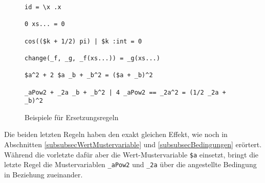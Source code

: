 \begin{figure}
\begin{verbatim}
id = \x .x

0 xs... = 0

cos(($k + 1/2) pi) | $k :int = 0

change(_f, _g, _f(xs...)) = _g(xs...)

$a^2 + 2 $a _b + _b^2 = ($a + _b)^2

_aPow2 + _2a _b + _b^2 | 4 _aPow2 == _2a^2 = (1/2 _2a + _b)^2
\end{verbatim}
\label{figBspRegeln}
\caption{Beispiele für Ersetzungsregeln}
\end{figure}
Die beiden letzten Regeln haben den exakt gleichen Effekt, wie noch in Abschnitten \ref{subsubsecWertMustervariable} und \ref{subsubsecBedingungen} erörtert. Während die vorletzte dafür aber die Wert-Mustervariable \verb|$a| einsetzt, bringt die letzte Regel die Mustervariablen \verb|_aPow2| und \verb|_2a| über die angestellte Bedingung in Beziehung zueinander.



